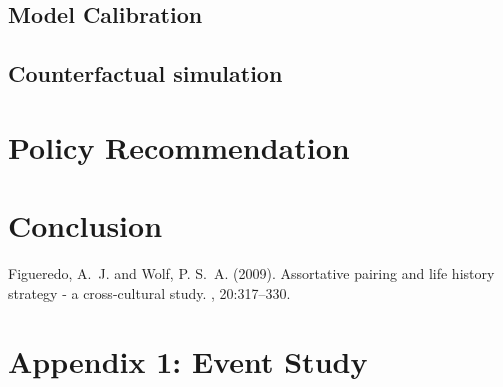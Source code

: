 \documentclass[12pt]{article} %
\begin{document}
\subsection{Model Calibration}


\subsection{Counterfactual simulation}


\section{Policy Recommendation}


\section{Conclusion}



\begin{thebibliography}{99} %

Figueredo, A.~J. and Wolf, P. S.~A. (2009).
\newblock Assortative pairing and life history strategy - a cross-cultural
  study.
, 20:317--330.
 
\end{thebibliography}


\section*{Appendix 1: Event Study}
\end{document}
